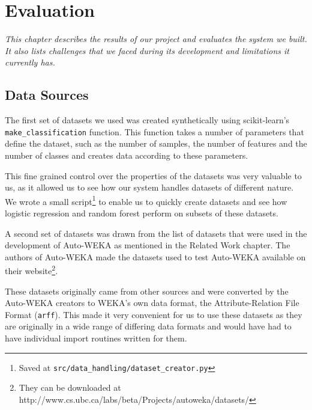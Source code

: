 \documentclass[a4paper,12pt,twoside,openright]{report}
\begin{document}
\chapter{Evaluation}
\textit{This chapter describes the results of our project and evaluates the system we built. It also lists challenges that we faced during its development and limitations it currently has.}




 




\section{Data Sources}
The first set of datasets we used was created synthetically using scikit-learn's \texttt{make\_classification} function. This function takes a number of parameters that define the dataset, such as the number of samples, the number of features and the number of classes and creates data according to these parameters. 

This fine grained control over the properties of the datasets was very valuable to us, as it allowed us to see how our system handles datasets of different nature. We wrote a small script\footnote{Saved at \texttt{src/data\_handling/dataset\_creator.py}} to enable us to quickly create datasets and see how logistic regression and random forest perform on subsets of these datasets.


A second set of datasets was drawn from the list of datasets that were used in the development of Auto-WEKA as mentioned in the Related Work chapter. The authors of Auto-WEKA made the datasets used to test Auto-WEKA available on their website\footnote{They can be downloaded at http://www.cs.ubc.ca/labs/beta/Projects/autoweka/datasets/}.


These datasets originally came from other sources \cite{Lichman:2013, Larochelle:2007:EED:1273496.1273556, Krizhevsky09learningmultiple} and were converted by the Auto-WEKA creators to WEKA's own data format, the Attribute-Relation File Format (\texttt{arff}). This made it very convenient for us to use these datasets as they are originally in a wide range of differing data formats and would have had to have individual import routines written for them. 
\end{document}
